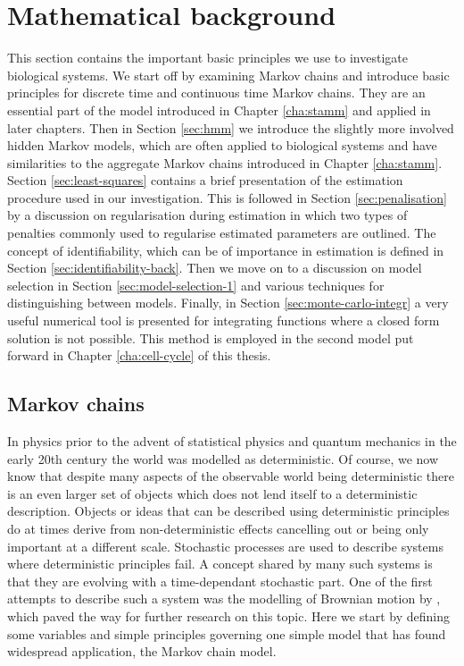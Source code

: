 
\section{Mathematical background}
\label{sec:math-backgr}

This section contains the important basic principles we use to investigate biological systems. We start off by examining Markov chains and introduce basic principles for discrete time and continuous time Markov chains. They  are an essential part of the model introduced in Chapter \ref{cha:stamm} and applied in later chapters. Then in Section \ref{sec:hmm} we introduce the slightly more involved hidden Markov models, which are often applied to biological systems and have similarities to the aggregate Markov chains introduced in Chapter \ref{cha:stamm}. Section \ref{sec:least-squares} contains a brief presentation of the estimation procedure used in our investigation. This is followed in Section \ref{sec:penalisation} by a discussion on regularisation during estimation in which two types of penalties commonly used to regularise estimated parameters are outlined. The concept of identifiability, which can be of importance in estimation is defined in Section \ref{sec:identifiability-back}. Then we move on to a discussion on model selection in Section \ref{sec:model-selection-1} and various techniques for distinguishing between models. Finally, in Section \ref{sec:monte-carlo-integr} a very useful numerical tool is presented for integrating functions where a closed form solution is not possible. This method is employed in the second model put forward in Chapter \ref{cha:cell-cycle} of this thesis.

\subsection{Markov chains}
\label{sec:markov-chains}

In physics prior to the advent of statistical physics and quantum mechanics in the early 20th century the world was modelled as deterministic. Of course, we now know that despite many aspects of the observable world being deterministic there is an even larger set of objects which does not lend itself to a deterministic description. Objects or ideas that can be described using deterministic principles do at times derive from non-deterministic effects cancelling out or being only important at a different scale. Stochastic processes are used to describe systems where deterministic principles fail. A concept shared by many such systems is that they are evolving with a time-dependant stochastic part. One of the first attempts to describe such a system was the modelling of Brownian motion by \cite{Einstein:2005ww}, which paved the way for further research on this topic. Here we start by defining some variables and simple principles governing one simple model that has found widespread application, the Markov chain model.

